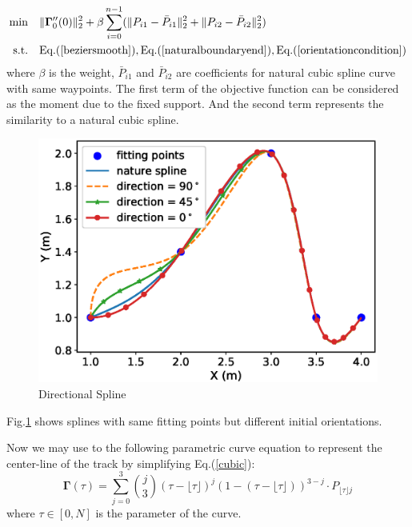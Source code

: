 \documentclass[conference, onecolumn]{IEEEtran}
\begin{document}
\begin{equation}
	\begin{aligned}
		\min \quad & \| \mathbf{\Gamma}_{0}''(0)\| _2^2+\beta \sum_{i = 0}^{n-1}(\| P_{i1}-\bar{P}_{i1}\| _2^2+ \| P_{i2}-\bar{P}_{i2}\| _2^2)\\
		\textrm{s.t.} \quad & \textrm{Eq.(\ref{beziersmooth})},\textrm{Eq.(\ref{naturalboundaryend})},\textrm{Eq.(\ref{orientationcondition})}
	\end{aligned}
\end{equation}
where $\beta$ is the weight, $\bar{P}_{i1}$ and $\bar{P}_{i2}$ are coefficients for natural cubic spline curve with same waypoints. The first term of the objective function can be considered as the moment due to the fixed support. And the second term represents the similarity to a natural cubic spline.


\begin{figure}[h]
	\centering
	\includegraphics[scale=0.5]{spline.eps}
	\caption{Directional Spline}
	\label{fig_directional_spline}
\end{figure}

Fig.\ref{fig_directional_spline} shows splines with same fitting points but different initial orientations. 

Now we may use to the following parametric curve equation to represent the center-line of the track by simplifying Eq.(\ref{cubic}):
\begin{equation}\label{centerline}
	\mathbf{\Gamma}( \tau)=\sum_{j = 0}^{3}\binom{j}{3}  (\tau-\lfloor \tau\rfloor)^j(1-(\tau-\lfloor \tau \rfloor) )^{3-j}\cdot P_{\lfloor \tau \rfloor j}
\end{equation} 
where $\tau \in [0,N]$ is the parameter of the curve. 
\end{document}
